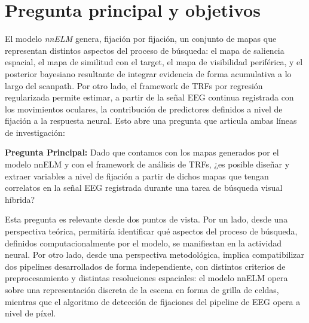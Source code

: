\section{Pregunta principal y objetivos}
\label{sec:pregunta_objetivos}

%

El modelo \textit{nnELM} genera, fijación por fijación, un conjunto de mapas que representan distintos aspectos del proceso de búsqueda: el mapa de saliencia espacial, el mapa de similitud con el target, el mapa de visibilidad periférica, y el posterior bayesiano resultante de integrar evidencia de forma acumulativa a lo largo del scanpath. Por otro lado, el framework de TRFs por regresión regularizada permite estimar, a partir de la señal EEG continua registrada con los movimientos oculares, la contribución de predictores definidos a nivel de fijación a la respuesta neural. Esto abre una pregunta que articula ambas líneas de investigación:

\begin{tcolorbox}[
    colback=gray!10,
    colframe=black!60,
    boxrule=0.8pt,
    arc=4pt,
    left=10pt, right=10pt, top=8pt, bottom=8pt
]
\textbf{Pregunta Principal:}{ Dado que contamos con los mapas generados por el modelo nnELM y con el framework de análisis de TRFs, ¿es posible diseñar y extraer variables a nivel de fijación a partir de dichos mapas que tengan correlatos en la señal EEG registrada durante una tarea de búsqueda visual híbrida?}
\end{tcolorbox}

\noindent Esta pregunta es relevante desde dos puntos de vista. Por un lado, desde una perspectiva teórica, permitiría identificar qué aspectos del proceso de búsqueda, definidos computacionalmente por el modelo, se manifiestan en la actividad neural. Por otro lado, desde una perspectiva metodológica, implica compatibilizar dos pipelines desarrollados de forma independiente, con distintos criterios de preprocesamiento y distintas resoluciones espaciales: el modelo nnELM opera sobre una representación discreta de la escena en forma de grilla de celdas, mientras que el algoritmo de detección de fijaciones del pipeline de EEG opera a nivel de píxel.

